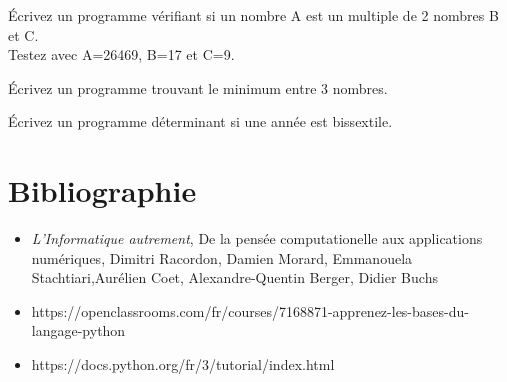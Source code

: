\documentclass[11pt, a4paper]{book}
\begin{document}
\begin{exercice}
Écrivez un programme vérifiant si un nombre A est un multiple de 2 nombres B et C.\\ 
Testez avec A=26469, B=17 et C=9.
\end{exercice}


\begin{exercice}
\label{exo:min}
Écrivez un programme trouvant le minimum entre 3 nombres.
\end{exercice}

\begin{exercice}
Écrivez un programme déterminant si une année est bissextile.
\end{exercice}




\section{Bibliographie}
\begin{itemize}
\item  \textit{L’Informatique autrement}, De la pensée computationelle aux applications numériques, Dimitri Racordon, Damien Morard, Emmanouela Stachtiari,Aurélien Coet, Alexandre-Quentin Berger, Didier Buchs 
\item  https://openclassrooms.com/fr/courses/7168871-apprenez-les-bases-du-langage-python
\item  https://docs.python.org/fr/3/tutorial/index.html
\end{itemize}
\end{document}
